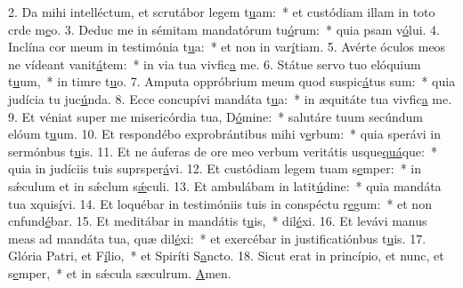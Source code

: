 2. Da mihi intelléctum, et scrutábor legem t\uline{u}am:~* et custódiam illam in toto crde m\uline{e}o.
3. Deduc me in sémitam mandatórum tu\uline{ó}rum:~* quia psam v\uline{ó}lui.
4. Inclína cor meum in testimónia t\uline{u}a:~* et non in var\uline{í}tiam.
5. Avérte óculos meos ne vídeant vanit\uline{á}tem:~* in via tua vivfic\uline{a} me.
6. Státue servo tuo elóquium t\uline{u}um,~* in timre t\uline{u}o.
7. Amputa oppróbrium meum quod suspic\uline{á}tus sum:~* quia judícia tu juc\uline{ú}nda.
8. Ecce concupívi mandáta t\uline{u}a:~* in æquitáte tua vivfic\uline{a} me.
9. Et véniat super me misericórdia tua, D\uline{ó}mine:~* salutáre tuum secúndum elóum t\uline{u}um.
10. Et respondébo exprobrántibus mihi v\uline{e}rbum:~* quia sperávi in sermónbus t\uline{u}is.
11. Et ne áuferas de ore meo verbum veritátis usque\uline{quá}que:~* quia in judíciis tuis suprsper\uline{á}vi.
12. Et custódiam legem tuam s\uline{e}mper:~* in sǽculum et in sǽclum s\uline{ǽ}culi.
13. Et ambulábam in latit\uline{ú}dine:~* quia mandáta tua xquis\uline{í}vi.
14. Et loquébar in testimóniis tuis in conspéctu r\uline{e}gum:~* et non cnfund\uline{é}bar.
15. Et meditábar in mandátis t\uline{u}is,~*  dil\uline{é}xi.
16. Et levávi manus meas ad mandáta tua, quæ dil\uline{é}xi:~* et exercébar in justificatiónbus t\uline{u}is.
17. Glória Patri, et F\uline{í}lio,~* et Spiríti S\uline{a}ncto.
18. Sicut erat in princípio, et nunc, et s\uline{e}mper,~* et in sǽcula sæculrum. \uline{A}men.
